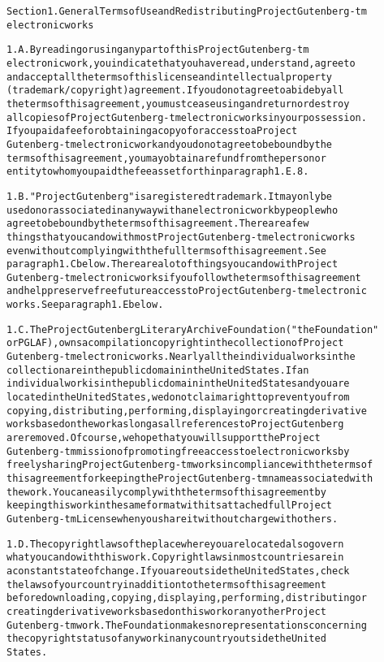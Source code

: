 \documentclass[12pt,leqno]{book}[2005/09/16]
\newenvironment{PGtext}{%
\begin{alltt}
\fontsize{9.2}{10.5}\ttfamily\selectfont}%
{\end{alltt}}
\begin{document}
\begin{PGtext}
Section 1.  General Terms of Use and Redistributing Project Gutenberg-tm
electronic works

1.A.  By reading or using any part of this Project Gutenberg-tm
electronic work, you indicate that you have read, understand, agree to
and accept all the terms of this license and intellectual property
(trademark/copyright) agreement.  If you do not agree to abide by all
the terms of this agreement, you must cease using and return or destroy
all copies of Project Gutenberg-tm electronic works in your possession.
If you paid a fee for obtaining a copy of or access to a Project
Gutenberg-tm electronic work and you do not agree to be bound by the
terms of this agreement, you may obtain a refund from the person or
entity to whom you paid the fee as set forth in paragraph 1.E.8.

1.B.  "Project Gutenberg" is a registered trademark.  It may only be
used on or associated in any way with an electronic work by people who
agree to be bound by the terms of this agreement.  There are a few
things that you can do with most Project Gutenberg-tm electronic works
even without complying with the full terms of this agreement.  See
paragraph 1.C below.  There are a lot of things you can do with Project
Gutenberg-tm electronic works if you follow the terms of this agreement
and help preserve free future access to Project Gutenberg-tm electronic
works.  See paragraph 1.E below.

1.C.  The Project Gutenberg Literary Archive Foundation ("the Foundation"
or PGLAF), owns a compilation copyright in the collection of Project
Gutenberg-tm electronic works.  Nearly all the individual works in the
collection are in the public domain in the United States.  If an
individual work is in the public domain in the United States and you are
located in the United States, we do not claim a right to prevent you from
copying, distributing, performing, displaying or creating derivative
works based on the work as long as all references to Project Gutenberg
are removed.  Of course, we hope that you will support the Project
Gutenberg-tm mission of promoting free access to electronic works by
freely sharing Project Gutenberg-tm works in compliance with the terms of
this agreement for keeping the Project Gutenberg-tm name associated with
the work.  You can easily comply with the terms of this agreement by
keeping this work in the same format with its attached full Project
Gutenberg-tm License when you share it without charge with others.

1.D.  The copyright laws of the place where you are located also govern
what you can do with this work.  Copyright laws in most countries are in
a constant state of change.  If you are outside the United States, check
the laws of your country in addition to the terms of this agreement
before downloading, copying, displaying, performing, distributing or
creating derivative works based on this work or any other Project
Gutenberg-tm work.  The Foundation makes no representations concerning
the copyright status of any work in any country outside the United
States.


\end{PGtext}
\end{document}

